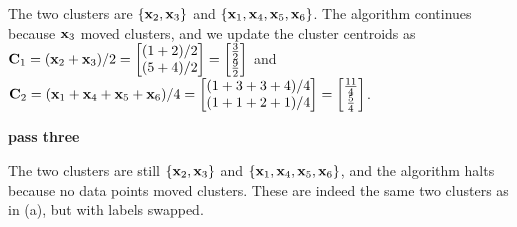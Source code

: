 \begin{solution}
\begin{enumerate}
  The two clusters are $ \{\mathbf{x}_2, \mathbf{x}_3\}$ and  $\{\mathbf{x}_1, \mathbf{x}_4, \mathbf{x}_5, \mathbf{x}_6\}$.   The algorithm continues because $\mathbf{x}_3$ moved clusters, and we update the cluster centroids as
  $\mathbf{C}_1 = (\mathbf{x}_2 + \mathbf{x}_3)/2
  = \begin{bmatrix}(1 + 2)/2\\(5 + 4)/2\end{bmatrix} = \begin{bmatrix}\frac{3}{2} \\ \frac{9}{2}\end{bmatrix}$ and $\mathbf{C}_2 = (\mathbf{x}_1 + \mathbf{x}_4 + \mathbf{x}_5 + \mathbf{x}_6)/4
  = \begin{bmatrix}(1 + 3 + 3 + 4) / 4 \\ (1 + 1 + 2 + 1)/4\end{bmatrix} = \begin{bmatrix}\frac{11}{4} \\ \frac{5}{4}\end{bmatrix}$.
  
    \textbf{pass three}
    
   The two clusters are still $\{\mathbf{x}_2, \mathbf{x}_3\}$ and $\{\mathbf{x}_1, \mathbf{x}_4, \mathbf{x}_5, \mathbf{x}_6\}$, and the algorithm halts because no data points moved clusters. These are indeed the same two clusters as in (a), but with labels swapped.
  
\end{enumerate}
\end{solution}


